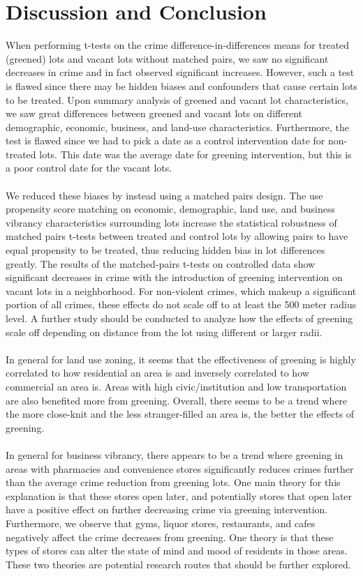 \documentclass{article}
\begin{document}
\section{Discussion and Conclusion}
When performing t-tests on the crime difference-in-differences means for treated (greened) lots and vacant lots without matched pairs, we saw no significant decreases in crime and in fact observed significant increases. However, such a test is flawed since there may be hidden biases and confounders that cause certain lots to be treated. Upon summary analysis of greened and vacant lot characteristics, we saw great differences between greened and vacant lots on different demographic, economic, business, and land-use characteristics. Furthermore, the test is flawed since we had to pick a date as a control intervention date for non-treated lots. This date was the average date for greening intervention, but this is a poor control date for the vacant lots.\\\\
We reduced these biases by instead using a matched pairs design. The use propensity score matching on economic, demographic, land use, and business vibrancy characteristics surrounding lots increase the statistical robustness of matched pairs t-tests between treated and control lots by allowing pairs to have equal propensity to be treated, thus reducing hidden bias in lot differences greatly. The results of the matched-pairs t-tests on controlled data show significant decreases in crime with the introduction of greening intervention on vacant lots in a neighborhood. For non-violent crimes, which makeup a significant portion of all crimes, these effects do not scale off to at least the 500 meter radius level. A further study should be conducted to analyze how the effects of greening scale off depending on distance from the lot using different or larger radii.\\\\
In general for land use zoning, it seems that the effectiveness of greening is highly correlated to how residential an area is and inversely correlated to how commercial an area is. Areas with high civic/institution and low transportation are also benefited more from greening. Overall, there seems to be a trend where the more close-knit and the less stranger-filled an area is, the better the effects of greening.\\\\
In general for business vibrancy, there appears to be a trend where greening in areas with pharmacies and convenience stores significantly reduces crimes further than the average crime reduction from greening lots. One main theory for this explanation is that these stores open later, and potentially stores that open later have a positive effect on further decreasing crime via greening intervention. Furthermore, we observe that gyms, liquor stores, restaurants, and cafes negatively affect the crime decreases from greening. One theory is that these types of stores can alter the state of mind and mood of residents in those areas. These two theories are potential research routes that should be further explored.\\\\
\end{document}
